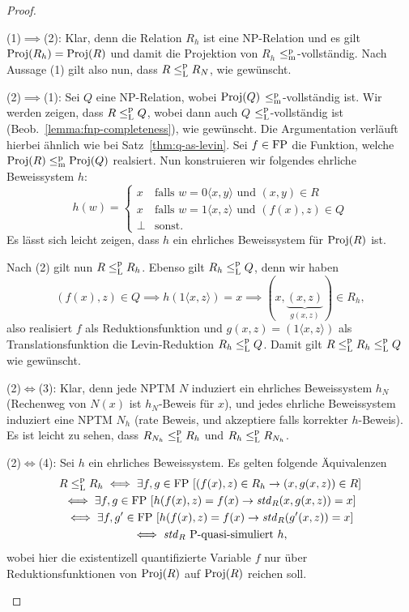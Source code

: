 \begin{proof}
    \begin{prooflist}
    \item (1)$\implies$(2): Klar, denn die Relation $R_h$ ist eine NP-Relation und es gilt $\operatorname{Proj}(R_h)=\operatorname{Proj}(R)$ und damit die Projektion von $R_h$ $\leq_\mathrm{m}^\mathrm{p}$-vollständig. Nach Aussage (1) gilt also nun, dass $R\leq_\mathrm{L}^\mathrm{p} R_N$, wie gewünscht.

    \item (2)$\implies$(1): Sei $Q$ eine NP-Relation, wobei $\operatorname{Proj}(Q)$ $\leq_\mathrm{m}^\mathrm{p}$-vollständig ist. Wir werden zeigen, dass $R\leq_\mathrm{L}^\mathrm{p} Q$, wobei dann auch $Q$ $\leq_\mathrm{L}^\mathrm{p}$-vollständig ist (Beob.~\ref{lemma:fnp-completeness}), wie gewünscht.
        Die Argumentation verläuft hierbei ähnlich wie bei Satz~\ref{thm:q-as-levin}. Sei $f\in\mathrm{FP}$ die Funktion, welche $\operatorname{Proj}(R)\leq_\mathrm{m}^\mathrm{p} \operatorname{Proj}(Q)$ realsiert.
        Nun konstruieren wir folgendes ehrliche Beweissystem $h$:
        \[ h(w) = \begin{cases} x & \text{falls $w=0\langle x, y\rangle$ und $(x,y)\in R$} \\ x & \text{falls $w=1\langle x, z\rangle$ und $(f(x), z)\in Q$} \\ \bot & \text{sonst}. \end{cases}\]
Es lässt sich leicht zeigen, dass $h$ ein ehrliches Beweissystem für $\operatorname{Proj}(R)$ ist.

        Nach (2) gilt nun $R \leq_\mathrm{L}^\mathrm{p} R_h$. Ebenso gilt $R_h\leq_\mathrm{L}^\mathrm{p} Q$, denn wir haben
        \[ (f(x), z)\in Q \implies h(1\langle x,z\rangle )=x \implies (x, \underbrace{(x,z)}_{g(x,z)})\in R_h, \]
        also realisiert $f$ als Reduktionsfunktion und $g(x,z)=(1\langle x,z\rangle )$ als Translationsfunktion die Levin-Reduktion $R_h\leq_\mathrm{L}^\mathrm{p} Q$. Damit gilt $R\leq_\mathrm{L}^\mathrm{p} R_h\leq_\mathrm{L}^\mathrm{p} Q$ wie gewünscht.

    \item (2)$\iff$(3): Klar, denn jede NPTM $N$ induziert ein ehrliches Beweissystem $h_N$ (Rechenweg von $N(x)$ ist $h_N$-Beweis für $x$), und jedes ehrliche Beweissystem induziert eine NPTM $N_h$ (rate Beweis, und akzeptiere falls korrekter $h$-Beweis). Es ist leicht zu sehen, dass $R_{N_h}\leq_\mathrm{L}^\mathrm{p} R_h$ und $R_h\leq_\mathrm{L}^\mathrm{p} R_{N_h}$.

    \item (2)$\iff$(4): Sei $h$ ein ehrliches Beweissystem. 
        Es gelten folgende Äquivalenzen
        \begin{gather*}
            R\leq_\mathrm{L}^\mathrm{p} R_h \iff \exists f,g\in\mathrm{FP}\, \left[ (f(x), z)\in R_h \rightarrow (x, g(x,z))\in R\right]\\
            \iff \exists f,g\in\mathrm{FP}\, \left[ h(f(x), z)=f(x) \rightarrow \mathit{std}_R(x, g(x,z))=x \right]\\
            \iff \exists f,g'\in\mathrm{FP}\, \left[ h(f(x), z)=f(x) \rightarrow \mathit{std}_R(g'(x,z))=x \right]\\
            \iff \text{$\mathit{std}_R$ $\mathrm{P}$-quasi-simuliert $h$},
        \end{gather*}
        wobei hier die existentizell quantifizierte Variable $f$ nur über Reduktionsfunktionen von $\operatorname{Proj}(R)$ auf $\operatorname{Proj}(R)$ reichen soll.\qedhere


\end{prooflist}
\end{proof}
